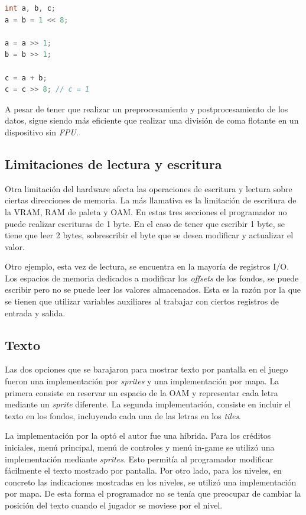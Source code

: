 \begin{lstlisting}[language=c,caption={Ejemplo de un cálculo con números de coma fija.},label={lst:fixed_numbers}]
int a, b, c;
a = b = 1 << 8;

a = a >> 1;
b = b >> 1;

c = a + b;
c = c >> 8; // c = 1

\end{lstlisting}

A pesar de tener que realizar un preprocesamiento y postprocesamiento de los datos, sigue siendo más eficiente que realizar una división de coma flotante en un dispositivo sin \textit{FPU}.

\subsection{Limitaciones de lectura y escritura}
Otra limitación del hardware afecta las operaciones de escritura y lectura sobre ciertas direcciones de memoria. La más llamativa es la limitación de escritura de la VRAM, RAM de paleta y OAM. En estas tres secciones el programador no puede realizar escrituras de 1 byte. En el caso de tener que escribir 1 byte, se tiene que leer 2 bytes, sobrescribir el byte que se desea modificar y actualizar el valor.

Otro ejemplo, esta vez de lectura, se encuentra en la mayoría de registros I/O. Los espacios de memoria dedicados a modificar los \textit{offsets} de los fondos, se puede escribir pero no se puede leer los valores almacenados. Esta es la razón por la que se tienen que utilizar variables auxiliares al trabajar con ciertos registros de entrada y salida.

\subsection{Texto}
Las dos opciones que se barajaron para mostrar texto por pantalla en el juego fueron una implementación por \textit{sprites} y una implementación por mapa. La primera consiste en reservar un espacio de la OAM y representar cada letra mediante un \textit{sprite} diferente. La segunda implementación, consiste en incluir el texto en los fondos, incluyendo cada una de las letras en los \textit{tiles}.

La implementación por la optó el autor fue una híbrida. Para los créditos iniciales, menú principal, menú de controles y menú in-game se utilizó una implementación mediante \textit{sprites}. Esto permitía al programador modificar fácilmente el texto mostrado por pantalla. Por otro lado, para los niveles, en concreto las indicaciones mostradas en los niveles, se utilizó una implementación por mapa. De esta forma el programador no se tenía que preocupar de cambiar la posición del texto cuando el jugador se moviese por el nivel.

